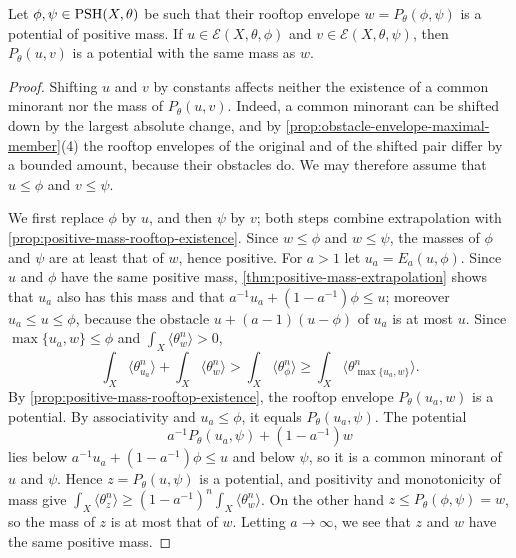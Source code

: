 \begin{proposition}\label{prop:rooftop-full-mass-substitution}
Let $\phi,\psi\in\mathrm{PSH}(X,\theta)$ be such that their rooftop envelope $w=P_\theta(\phi,\psi)$ is a potential of positive mass. If $u\in\mathcal E(X,\theta,\phi)$ and $v\in\mathcal E(X,\theta,\psi)$, then $P_\theta(u,v)$ is a potential with the same mass as $w$.
\end{proposition}
\begin{proof}
Shifting $u$ and $v$ by constants affects neither the existence of a common minorant nor the mass of $P_\theta(u,v)$. Indeed, a common minorant can be shifted down by the largest absolute change, and by \cref{prop:obstacle-envelope-maximal-member}(4) the rooftop envelopes of the original and of the shifted pair differ by a bounded amount, because their obstacles do. We may therefore assume that $u\leq\phi$ and $v\leq\psi$.

We first replace $\phi$ by $u$, and then $\psi$ by $v$; both steps combine extrapolation with \cref{prop:positive-mass-rooftop-existence}. Since $w\leq\phi$ and $w\leq\psi$, the masses of $\phi$ and $\psi$ are at least that of $w$, hence positive. For $a>1$ let $u_a=E_a(u,\phi)$. Since $u$ and $\phi$ have the same positive mass, \cref{thm:positive-mass-extrapolation} shows that $u_a$ also has this mass and that $a^{-1}u_a+(1-a^{-1})\phi\leq u$; moreover $u_a\leq u\leq\phi$, because the obstacle $u+(a-1)(u-\phi)$ of $u_a$ is at most $u$. Since $\max\{u_a,w\}\leq\phi$ and $\int_X\langle\theta_w^n\rangle>0$,
\[
 \int_X\langle\theta_{u_a}^n\rangle+\int_X\langle\theta_w^n\rangle>\int_X\langle\theta_\phi^n\rangle\geq\int_X\langle\theta_{\max\{u_a,w\}}^n\rangle.
\]
By \cref{prop:positive-mass-rooftop-existence}, the rooftop envelope $P_\theta(u_a,w)$ is a potential. By associativity and $u_a\leq\phi$, it equals $P_\theta(u_a,\psi)$. The potential
\[
 a^{-1}P_\theta(u_a,\psi)+(1-a^{-1})w
\]
lies below $a^{-1}u_a+(1-a^{-1})\phi\leq u$ and below $\psi$, so it is a common minorant of $u$ and $\psi$. Hence $z=P_\theta(u,\psi)$ is a potential, and positivity and monotonicity of mass give $\int_X\langle\theta_z^n\rangle\geq(1-a^{-1})^n\int_X\langle\theta_w^n\rangle$. On the other hand $z\leq P_\theta(\phi,\psi)=w$, so the mass of $z$ is at most that of $w$. Letting $a\to\infty$, we see that $z$ and $w$ have the same positive mass.


\end{proof}
